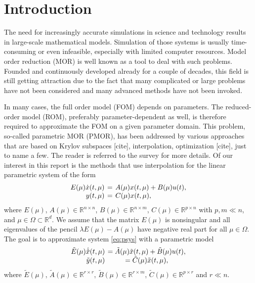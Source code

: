 \section{Introduction}\label{Sec:Intro}
The need for increasingly accurate simulations in science and
technology results in large-scale mathematical models. Simulation of those systems is usually time-consuming or even infeasible, especially with limited computer resources. Model order reduction (MOR) is well known as a tool to
deal with such problems. Founded and continuously developed already for a couple of decades, this field is still getting attraction due to the fact that many complicated or large problems have not been considered and many advanced methods have not been invoked. 

In many cases, the full order model (FOM) depends on parameters. The reduced-order model (ROM), preferably parameter-dependent as well, is therefore required to approximate the FOM on a given parameter domain. This problem, so-called parametric MOR (PMOR), has been addressed by various approaches that are based on Krylov subspaces [cite], interpolation, optimization [cite], just to name a few. The reader is referred to the survey \cite{BennGW15} for more details. Of our interest in this report is the methods that use interpolation for the linear parametric system of the form
\begin{equation}
\label{eq:psys}
\arraycolsep=2pt
\begin{array}{rcl}
E(\mu)\dot{x}(t,\mu) & = &A(\mu)x(t,\mu)+B(\mu)u(t),\\
y(t,\mu) & = & C(\mu)x(t,\mu),
\end{array}
\end{equation}
where $E(\mu)$, $A(\mu) \in \mathbb{R}^{n\times n}$, $B(\mu) \in \mathbb{R}^{n\times m}$, 
$C(\mu) \in \mathbb{R}^{p\times n}$ with $p,m \ll n$, and $\mu\in\Omega\subset \mathbb{R}^d$. We assume that the matrix 
$E(\mu)$ is nonsingular and all eigenvalues of the pencil $\lambda E(\mu)-A(\mu)$ have negative real part for all $\mu\in\Omega$. The goal is to approximate system \eqref{eq:psys} with a parametric model
\begin{equation}
\label{eq:redpsys}
\arraycolsep=2pt
\begin{array}{rcl}
\tilde{E}(\mu)\dot{\tilde{x}}(t,\mu) & =\tilde{A}(\mu)\tilde{x}(t,\mu)+\tilde{B}(\mu)u(t),\\
\tilde{y}(t,\mu) & =\tilde{C}(\mu)\tilde{x}(t,\mu),
\end{array}
\end{equation}
where $\tilde{E}(\mu)$, $\tilde{A}(\mu) \in \mathbb{R}^{r\times r}$, $\tilde{B}(\mu)\in\mathbb{R}^{r\times m}$, 
$\tilde{C}(\mu) \in \mathbb{R}^{p\times r}$ and $r \ll n$. 

